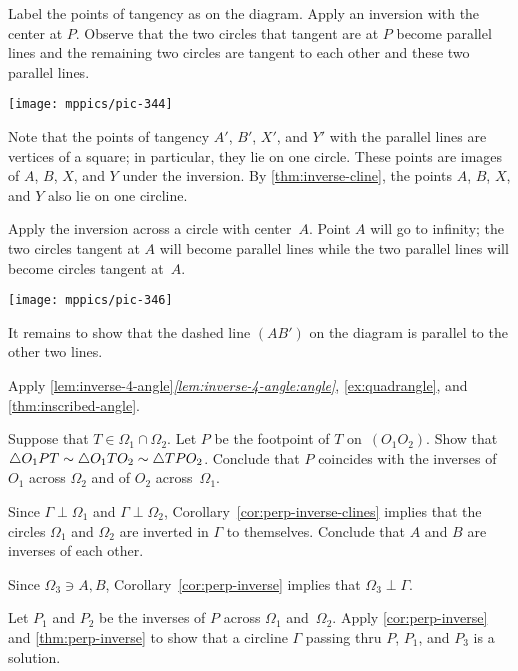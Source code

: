 Label the points of tangency as on the diagram.
Apply an inversion with the center at $P$. 
Observe that the two circles that tangent are at $P$ become parallel lines and 
the remaining two circles are tangent to each other and these two parallel lines.

\begin{Figure}
\centering
\texttt{[image: mppics/pic-344]}
\end{Figure}

Note that the points of tangency $A'$, $B'$, $X'$, and $Y'$ with the parallel lines are vertices of a square;
in particular, they lie on one circle.
These points are images of $A$, $B$, $X$, and $Y$ under the inversion.
By \ref{thm:inverse-cline}, the points $A$, $B$, $X$, and $Y$ also lie on one circline.

Apply the inversion across a circle with center~$A$. 
Point $A$ will go to infinity; the two circles tangent at $A$ will become parallel lines
while the two parallel lines will become circles tangent at~$A$.

\begin{Figure}
\centering
\texttt{[image: mppics/pic-346]}
\end{Figure}

It remains to show that the dashed line $(AB')$ on the diagram is parallel to the other two lines.

Apply \ref{lem:inverse-4-angle}\textit{\ref{lem:inverse-4-angle:angle}}, 
\ref{ex:quadrangle},
and \ref{thm:inscribed-angle}.

Suppose that $T\in \Omega_1\cap\Omega_2$.
Let $P$ be the footpoint of $T$ on~$(O_1O_2)$.
Show that
$\triangle O_1PT
\sim \triangle O_1TO_2
\sim \triangle TPO_2$.
Conclude that $P$ coincides with the inverses of $O_1$ across $\Omega_2$ and of $O_2$ across~$\Omega_1$.

Since $\Gamma\perp\Omega_1$ and $\Gamma\perp\Omega_2$,
Corollary~\ref{cor:perp-inverse-clines} 
implies that
the circles $\Omega_1$ and $\Omega_2$ are inverted in $\Gamma$ 
to themselves.
Conclude that $A$ and $B$ are inverses of each other.

Since $\Omega_3\ni A,B$,
Corollary~\ref{cor:perp-inverse} implies that
$\Omega_3\perp \Gamma$.

Let $P_1$ and $P_2$ be the inverses of $P$ 
across $\Omega_1$ and~$\Omega_2$.
Apply \ref{cor:perp-inverse} and \ref{thm:perp-inverse}
to show that a circline $\Gamma$ passing thru $P$, $P_1$, and $P_3$ is a solution.

